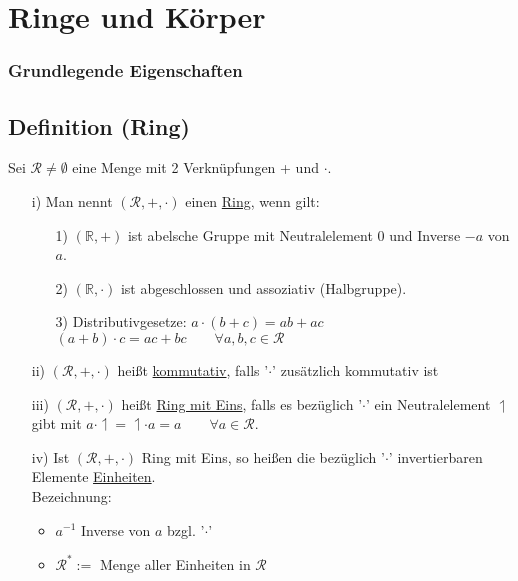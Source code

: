 \documentclass[12pt,titlepage, pdf]{article}
\newcommand{\R}{\mathds{R}}
\newcommand{\uline}[1]{\underline{#1}}
\renewcommand{\>}{\rightarrow}
\renewcommand{\*}{\cdot}
\begin{document}
	      \section{Ringe und Körper}
	      \subsubsection*{Grundlegende Eigenschaften}
	      \subsection{Definition (Ring)}
	      Sei $\mathcal{R} \neq \emptyset$ eine Menge mit 2 Verknüpfungen + und $\cdot$.
	      \begin{itemize}
	      	\item[i)] Man nennt $(\mathcal{R}, + , \cdot)$ einen \uline{Ring}, wenn gilt: 
	      	      \begin{itemize}
	      	      	\item[1)] $(\R, + )$ ist abelsche Gruppe mit Neutralelement 0 und Inverse $-a$ von $a$.
	      	      	\item[2)] $(\R, \cdot)$ ist abgeschlossen und assoziativ (Halbgruppe).
	      	      	\item[3)] Distributivgesetze: $a \cdot (b+c) = ab + ac$\\
	      	      	      \noindent\hspace*{32.5mm}$ (a+b) \cdot c = ac + bc \qquad \forall a,b,c \in \mathcal{R}$
	      	      \end{itemize}
	      	\item[ii)] $(\mathcal{R},+,\cdot)$ heißt \uline{kommutativ}, falls '$\cdot$' zusätzlich kommutativ ist
	      	\item[iii)] $(\mathcal{R},+,\cdot)$ heißt \uline{Ring mit Eins}, falls es bezüglich '$\cdot$' ein Neutralelement $\upharpoonleft$ gibt mit $a \cdot \upharpoonleft = \upharpoonleft \cdot a = a \qquad \forall a \in \mathcal{R}$.
	      	\item[iv)] Ist $(\mathcal{R},+,\cdot)$ Ring mit Eins, so heißen die bezüglich '$\cdot$' invertierbaren Elemente \uline{Einheiten}. \\
	      	      Bezeichnung: 
	      	      \begin{itemize}
	      	      	\item $a^{-1}$ Inverse von $a$ bzgl. '$\cdot$' \item $\mathcal{R}^* :=$ Menge aller Einheiten in $\mathcal{R}$
	      	      \end{itemize}
	      \end{itemize}
\end{document}
